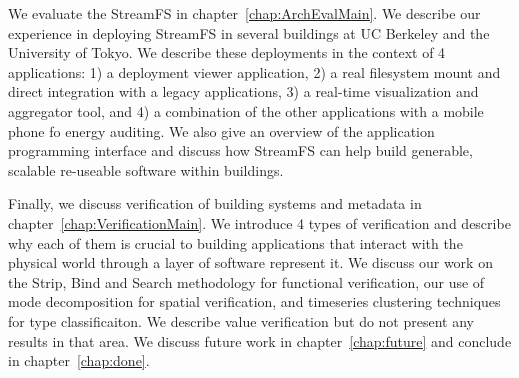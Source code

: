 We evaluate the StreamFS in chapter~\ref{chap:ArchEvalMain}.  We describe our experience in deploying StreamFS in several buildings
at UC Berkeley and the University of Tokyo.  We describe these deployments in the context of 4 applications: 1) a deployment viewer
application, 2) a real filesystem mount and direct integration with a legacy applications, 3) a real-time visualization and 
aggregator tool, and 4) a combination of the other applications with a mobile phone fo energy auditing.  We also give an overview of the
application programming interface and discuss how StreamFS can help build generable, scalable re-useable software within
buildings.

Finally, we discuss verification of building systems and metadata in chapter~\ref{chap:VerificationMain}.  We introduce 4 types of 
verification and describe why each of them is crucial to building applications that interact with the physical world through
a layer of software represent it.  We discuss our work on the Strip, Bind and Search methodology for functional verification, 
our use of mode decomposition for spatial verification, and timeseries clustering techniques for type classificaiton.  We
describe value verification but do not present any results in that area.
We discuss future work in chapter~\ref{chap:future} and conclude in chapter~\ref{chap:done}.




























